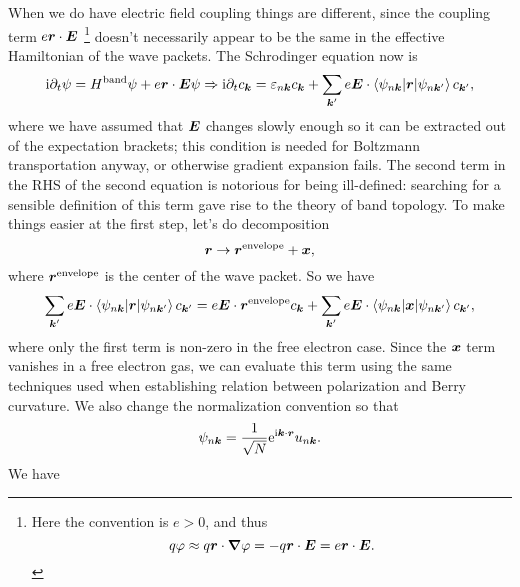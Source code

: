 \documentclass[hyperref, a4paper]{article}
\newcommand*{\ii}{\mathrm{i}}
\newcommand*{\ee}{\mathrm{e}}
\begin{document}
When we do have electric field coupling things are different, 
since the coupling term $e \vb*{r} \cdot \vb*{E}$%
\footnote{
    Here the convention is $e > 0$, 
    and thus 
    \begin{equation}
        q \varphi \approx q \vb*{r} \cdot \grad \varphi 
        = - q \vb*{r} \cdot \vb*{E} = e \vb*{r} \cdot \vb*{E}.
    \end{equation}
}
doesn't necessarily appear to be the same 
in the effective Hamiltonian of the wave packets. 
The Schrodinger equation now is 
\begin{equation}
    \ii \partial_t \psi = H^{\text{band}} \psi + e \vb*{r} \cdot \vb*{E} \psi
    \Rightarrow \ii \partial_t c_{\vb*{k}} = \varepsilon_{n \vb*{k}} c_{\vb*{k}}
    + \sum_{\vb*{k}'} e \vb*{E} \cdot 
    \mel**{\psi_{n \vb*{k}}}{\vb*{r}}{\psi_{n \vb*{k}'}} c_{\vb*{k}'},
\end{equation}
where we have assumed that $\vb*{E}$ changes slowly enough 
so it can be extracted out of the expectation brackets;
this condition is needed for Boltzmann transportation anyway, 
or otherwise gradient expansion fails. 
The second term in the RHS of the second equation 
is notorious for being ill-defined:
searching for a sensible definition of this term 
gave rise to the theory of band topology.
To make things easier at the first step, 
let's do decomposition 
\begin{equation}
    \vb*{r} \to \vb*{r}^{\text{envelope}} + \vb*{x},
\end{equation}
where $\vb*{r}^{\text{envelope}}$ is the center of the wave packet. 
So we have 
\begin{equation}
    \sum_{\vb*{k}'} e \vb*{E} \cdot 
    \mel**{\psi_{n \vb*{k}}}{\vb*{r}}{\psi_{n \vb*{k}'}} c_{\vb*{k}'}
    = e \vb*{E} \cdot \vb*{r}^{\text{envelope}} c_{\vb*{k}}
    + \sum_{\vb*{k}'} e \vb*{E} \cdot 
    \mel**{\psi_{n \vb*{k}}}{\vb*{x}}{\psi_{n \vb*{k}'}} c_{\vb*{k}'},
\end{equation}
where only the first term is non-zero in the free electron case.
Since the $\vb*{x}$ term vanishes in a free electron gas, 
we can evaluate this term using the same techniques 
used when establishing relation between 
polarization and Berry curvature. 
We also change the normalization convention so that 
\begin{equation}
    \psi_{n \vb*{k}} = \frac{1}{\sqrt{N}} \ee^{\ii \vb*{k} \cdot \vb*{r}} u_{n \vb*{k}}.
\end{equation}
We have 
\end{document}
